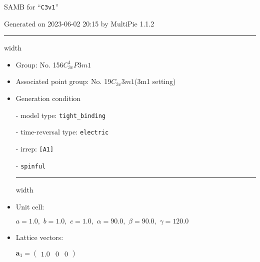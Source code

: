 \documentclass[fleqn,10pt,landscape]{article}
\begin{document}
\setcounter{MaxMatrixCols}{16}

\setlength{\baselineskip}{16pt}
\footnotesize
\begin{center}
\LARGE
SAMB for ``\texttt{C3v1}''
\end{center}
\begin{flushright}
Generated on 2023-06-02 20:15 by MultiPie 1.1.2
\end{flushright}
\vspace{1cm}


 \hfil \hrule height 1mm width \textwidth \hfil

\begin{itemize}
\item Group: No. 156\quad$C_{3v}^{1}$\quad$P3m1$\quad[ trigonal ]

\item Associated point group: No. 19\quad$C_{3v}$\quad$3m1$\quad(3m1 setting)\quad[ trigonal ]

\vspace{5mm}

\item Generation condition

\quad - model type: \texttt{tight_binding}

\quad - time-reversal type: \texttt{electric}

\quad - irrep: \texttt{[A1]}

\quad - \texttt{spinful}


 \hfil \hrule height 1mm width \textwidth \hfil

\item Unit cell:

\quad $a=1.0,\,\, b=1.0,\,\, c=1.0,\,\, \alpha=90.0,\,\, \beta=90.0,\,\, \gamma=120.0$

\item Lattice vectors:

\quad $\bm{a}_1=\begin{pmatrix} 1.0 & 0 & 0 \end{pmatrix}$


\end{itemize}
\end{document}

